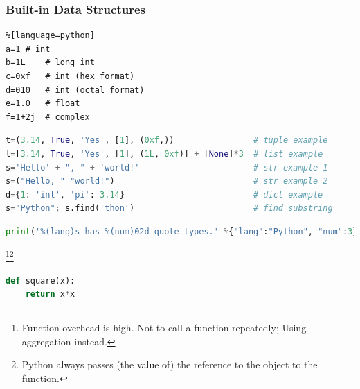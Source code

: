 \begin{frame}[fragile]
  \MyLogo
  \frametitle{Built-in Data Structures}  
\small

\smallskip
{}
\begin{lstlisting}%[language=python]
a=1	# int
b=1L 	# long int
c=0xf	# int (hex format)
d=010	# int (octal format)
e=1.0	# float
f=1+2j	# complex
\end{lstlisting}

\begin{lstlisting}[language=python]
t=(3.14, True, 'Yes', [1], (0xf,))                # tuple example
l=[3.14, True, 'Yes', [1], (1L, 0xf)] + [None]*3  # list example
s='Hello' + ", " + 'world!'                       # str example 1
s=("Hello, " "world!")                            # str example 2
d={1: 'int', 'pi': 3.14}                          # dict example
s="Python"; s.find('thon')                        # find substring
\end{lstlisting}

\begin{lstlisting}[language=python]
print('%(lang)s has %(num)02d quote types.' %{"lang":"Python", "num":3})
\end{lstlisting}

\footnote[frame]{\scriptsize\color{PineGreen}Function overhead is high. Not to call a function repeatedly; Using aggregation instead.}\footnote[frame]{\scriptsize\color{PineGreen}Python always passes (the value of) the reference to the object to the function.}

\begin{lstlisting}[language=python]
def square(x):
	return x*x
\end{lstlisting}

\end{frame}


